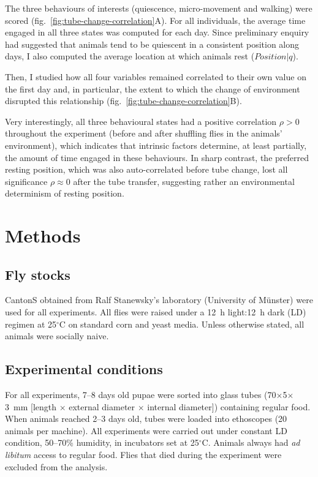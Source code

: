 The three behaviours of interests (quiescence, micro-movement and walking) were scored (fig.~\ref{fig:tube-change-correlation}A).
For all individuals, the average time engaged in all three states was computed for each day.
Since preliminary enquiry had suggested that animals tend to be quiescent in a consistent position along days, I also computed the average location at which animals rest ($Position | q$).

Then, I studied how all four variables remained correlated to their own value on the first day and, in particular, the extent to which the change of environment disrupted this relationship (fig.~\ref{fig:tube-change-correlation}B). 

Very interestingly, all three behavioural states had a positive correlation $\rho > 0$ throughout the experiment (before and after shuffling flies in the animals' environment), which indicates that intrinsic factors determine, at least partially, the amount of time engaged in these behaviours.
In sharp contrast, the preferred resting position, which was also auto-correlated before tube change, lost all significance $\rho \approx 0$ after the tube transfer, suggesting rather an environmental determinism of resting position.


\section{Methods}

\subsection{Fly stocks}
\label{subsec:mm-stock}

CantonS \dmel{} obtained from Ralf Stanewsky's laboratory (University of M{\"u}nster) were used for all experiments.
All flies were raised under a 12~h light:12~h dark (LD) regimen at 25$^{\circ}$C on standard corn and yeast media.
Unless otherwise stated, all animals were socially naive.

\subsection{Experimental conditions}
\label{subsec:mm-xp-conditions}

For all experiments, 7--8 days old pupae were sorted into glass tubes (70$\times$5$\times$3 mm [length $\times$ external diameter $\times$ internal diameter]) containing regular food. 
When animals reached 2--3 days old, tubes were loaded into ethoscopes (20 animals per machine).
All experiments were carried out under constant LD condition, 50--70\% humidity, in incubators set at 25$^{\circ}$C. 
Animals always had \emph{ad libitum} access to regular food.
Flies that died during the experiment were excluded from the analysis.

